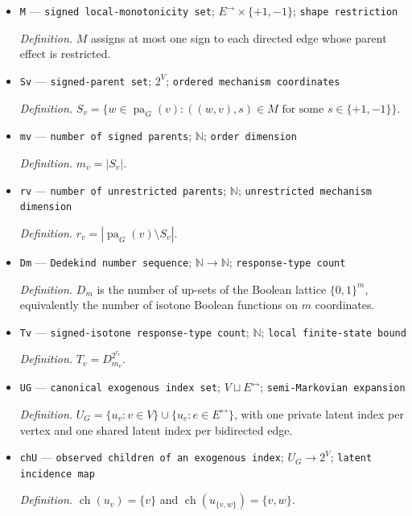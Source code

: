 \documentclass{article}
\begin{document}
\begin{itemize}
  \item \texttt{M} --- \texttt{signed local-\allowbreak{}monotonicity set}; \(E^{\to}\times\{+1,-1\}\); \texttt{shape restriction}
  \par\smallskip\noindent\emph{Definition.} \(M\) assigns at most one sign to each directed edge whose parent effect is restricted.
  \item \texttt{Sv} --- \texttt{signed-\allowbreak{}parent set}; \(2^V\); \texttt{ordered mechanism coordinates}
  \par\smallskip\noindent\emph{Definition.} \(S_v=\{w\in\operatorname{pa}_G(v):((w,v),s)\in M\text{ for some }s\in\{+1,-1\}\}\).
  \item \texttt{mv} --- \texttt{number of signed parents}; \(\mathbb N\); \texttt{order dimension}
  \par\smallskip\noindent\emph{Definition.} \(m_v=|S_v|\).
  \item \texttt{rv} --- \texttt{number of unrestricted parents}; \(\mathbb N\); \texttt{unrestricted mechanism dimension}
  \par\smallskip\noindent\emph{Definition.} \(r_v=|\operatorname{pa}_G(v)\setminus S_v|\).
  \item \texttt{Dm} --- \texttt{Dedekind number sequence}; \(\mathbb N\to\mathbb N\); \texttt{response-\allowbreak{}type count}
  \par\smallskip\noindent\emph{Definition.} \(D_m\) is the number of up-sets of the Boolean lattice \(\{0,1\}^m\), equivalently the number of isotone Boolean functions on \(m\) coordinates.
  \item \texttt{Tv} --- \texttt{signed-\allowbreak{}isotone response-\allowbreak{}type count}; \(\mathbb N\); \texttt{local finite-\allowbreak{}state bound}
  \par\smallskip\noindent\emph{Definition.} \(T_v=D_{m_v}^{2^{r_v}}\).
  \item \texttt{UG} --- \texttt{canonical exogenous index set}; \(V\sqcup E^{\leftrightarrow}\); \texttt{semi-\allowbreak{}Markovian expansion}
  \par\smallskip\noindent\emph{Definition.} \(U_G=\{u_v:v\in V\}\cup\{u_e:e\in E^{\leftrightarrow}\}\), with one private latent index per vertex and one shared latent index per bidirected edge.
  \item \texttt{chU} --- \texttt{observed children of an exogenous index}; \(U_G\to 2^V\); \texttt{latent incidence map}
  \par\smallskip\noindent\emph{Definition.} \(\operatorname{ch}(u_v)=\{v\}\) and \(\operatorname{ch}(u_{\{v,w\}})=\{v,w\}\).

\end{itemize}
\end{document}
